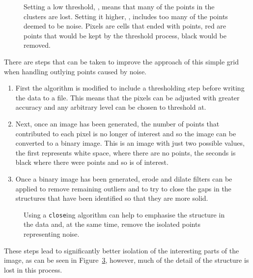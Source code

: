 \begin{figure}[ht]
\begin{subfigure}[b]{0.48\linewidth}
        \caption{}\label{fig:grid-noise-high.png}
    \end{subfigure}
    \caption{Setting a low threshold, , means
    that many of the points in the clusters are lost. Setting it higher,
    , includes too many of the points deemed to
    be noise. Pixels are cells that ended with points, red are points that
    would be kept by the threshold process, black would be
    removed.}\label{fig:grid-noise}
\end{figure}

There are steps that can be taken to improve the approach of this simple grid
when handling outlying points caused by noise.
\begin{enumerate}
	\item First the algorithm is modified to include a thresholding step before
	writing the data to a file. This means that the pixels can be adjusted with
	greater accuracy and any arbitrary level can be chosen to threshold at.
	\item Next, once an image has been generated, the number of points that
	contributed to each pixel is no longer of interest and so the image can be
	converted to a binary image. This is an image with just two possible
	values, the first represents white space, where there are no points, the
	seconds is black where there were points and so is of interest.
	\item Once a binary image has been generated, erode and dilate filters can
	be applied to remove remaining outliers and to try to close the gaps in the
	structures that have been identified so that they are more solid.
\end{enumerate}

\begin{figure}[tbhp]
	\centering
	\caption{Using a \texttt{close}ing algorithm can help to emphasise the
	structure in the data and, at the same time, remove the isolated points
	representing noise.}
	\label{fig:grid-threshold-close}
\end{figure}

These steps lead to significantly better isolation of the interesting parts of
the image, as can be seen in Figure~\ref{fig:grid-threshold-close}, however,
much of the detail of the structure is lost in this process.
